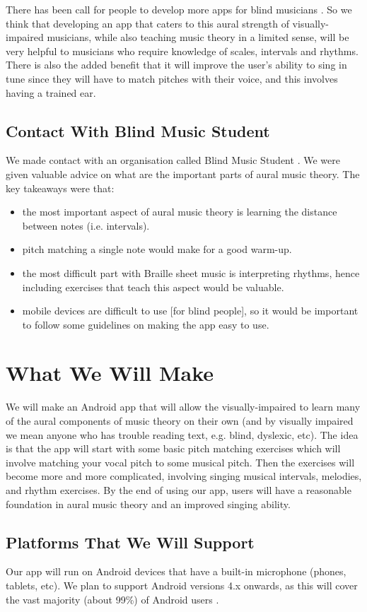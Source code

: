 \documentclass{article}
\begin{document}
There has been call for people to develop more apps for blind musicians \cite{cdm}. So we think that developing an app that caters to this aural strength of visually-impaired musicians, while also teaching music theory in a limited sense, will be very helpful to musicians who require knowledge of scales, intervals and rhythms. There is also the added benefit that it will improve the user's ability to sing in tune since they will have to match pitches with their voice, and this involves having a trained ear.
\subsection{Contact With Blind Music Student}
We made contact with an organisation called Blind Music Student \cite{blindmusicstudent}. We were given valuable advice on what are the important parts of aural music theory. The key takeaways were that:
\begin{itemize}
	\item the most important aspect of aural music theory is learning the distance between notes (i.e.  intervals).
	\item pitch matching a single note would make for a good warm-up.
	\item the most difficult part with Braille sheet music is interpreting rhythms, hence including exercises that teach this aspect would be valuable.
	\item mobile devices are difficult to use [for blind people], so it would be important to follow some guidelines on making the app easy to use.
\end{itemize}

\section{What We Will Make}
We will make an Android app that will allow the visually-impaired to learn many of the aural components of music theory on their own (and by visually impaired we mean anyone who has trouble reading text, e.g. blind, dyslexic, etc). The idea is that the app will start with some basic pitch matching exercises which will involve matching your vocal pitch to some musical pitch. Then the exercises will become more and more complicated, involving singing musical intervals, melodies, and rhythm exercises. By the end of using our app, users will have a reasonable foundation in aural music theory and an improved singing ability. 
\subsection{Platforms That We Will Support}
Our app will run on Android devices that have a built-in microphone (phones, tablets, etc). We plan to support Android versions 4.x onwards, as this will cover the vast majority (about 99\%) of Android users \cite{googledevelopers}. 
\end{document}
